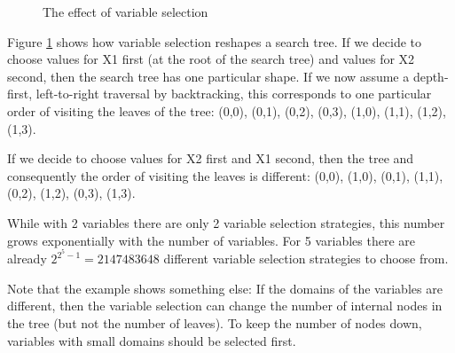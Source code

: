 \begin{figure}
\begin{center}
\end{center}
\caption{The effect of variable selection}
\label{figvarsel}
\end{figure}

Figure \ref{figvarsel} shows how variable selection reshapes a search tree.
If we decide to choose values for X1 first (at the root of the search tree)
and values for X2 second, then the search tree has one particular shape.
If we now assume a depth-first, left-to-right traversal by backtracking,
this corresponds to one particular order of visiting the leaves of the tree:
(0,0), (0,1), (0,2), (0,3), (1,0), (1,1), (1,2), (1,3).

If we decide to choose values for X2 first and X1 second, then the tree and
consequently the order of visiting the leaves is different:
(0,0), (1,0), (0,1), (1,1), (0,2), (1,2), (0,3), (1,3).

While with 2 variables there are only 2 variable selection strategies,
this number grows exponentially with the number of variables. For 5
variables there are already $2^{2^{5}-1} = 2147483648$ different variable selection
strategies to choose from.

Note that the example shows something else: If the domains of the variables
are different, then the variable selection can change the number of internal
nodes in the tree (but not the number of leaves). To keep the number of nodes
down, variables with small domains should be selected first.


